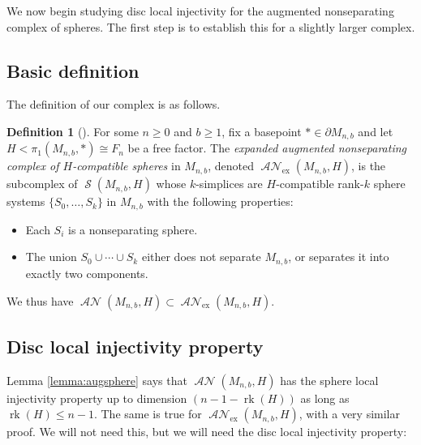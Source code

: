 \documentclass[11pt]{amsart}
\numberwithin{equation}{section}
\theoremstyle{plain}
\theoremstyle{definition}
\newtheorem{defn}[theorem]{Definition}
\newenvironment{definition}[1][]{\begin{defn}[#1]\pushQED{\qed}}{\popQED \end{defn}}
\theoremstyle{remark}
\DeclareMathOperator{\rank}{rk}
\DeclareMathOperator{\Spheres}{\mathcal{S}}
\DeclareMathOperator{\ANSpheres}{\mathcal{AN}}
\newcommand\ANSpheresEX{\ANSpheres_{\text{ex}}}
\begin{document}
We now begin studying disc local injectivity for the augmented nonseparating complex of spheres.  The
first step is to establish this for a slightly larger complex.

\subsection{Basic definition}
The definition of our complex is as follows.

\begin{definition}
For some $n \geq 0$ and $b \geq 1$, fix a basepoint $\ast \in \partial M_{n,b}$
and let $H < \pi_1(M_{n,b},\ast) \cong F_n$ be a free factor.  The {\em expanded augmented nonseparating complex of
$H$-compatible spheres} in $M_{n,b}$, denoted $\ANSpheresEX(M_{n,b},H)$, is
the subcomplex of $\Spheres(M_{n,b},H)$ whose $k$-simplices are $H$-compatible rank-$k$ sphere
systems $\{S_0,\ldots,S_k\}$ in $M_{n,b}$ with the following properties:
\begin{itemize}
\item Each $S_i$ is a nonseparating sphere.
\item The union $S_0 \cup \cdots \cup S_k$ either does not separate $M_{n,b}$, or separates
it into exactly two components. \qedhere 
\end{itemize}
\end{definition}

We thus have $\ANSpheres(M_{n,b},H) \subset \ANSpheresEX(M_{n,b},H)$.

\subsection{Disc local injectivity property}
Lemma \ref{lemma:augsphere} says that $\ANSpheres(M_{n,b},H)$ has the sphere
local injectivity property up to dimension $(n-1-\rank(H))$ as long as $\rank(H) \leq n-1$.
The same is true for $\ANSpheresEX(M_{n,b},H)$, with a very similar proof.
We will not need this, but we will need the disc local injectivity property:
\end{document}
